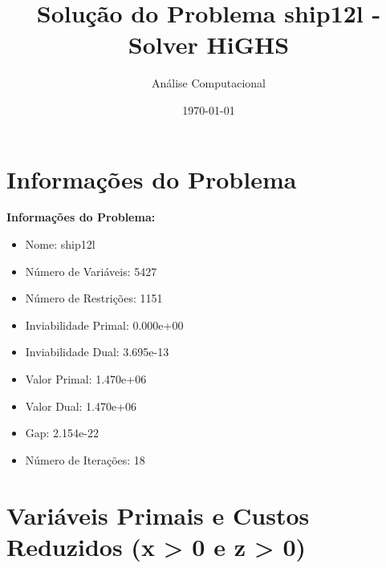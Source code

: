 \documentclass[12pt]{article}
\title{Solução do Problema ship12l - Solver HiGHS}
\author{Análise Computacional}
\date{\today}
\begin{document}
\maketitle

\section{Informações do Problema}

\textbf{Informações do Problema:}
\begin{itemize}
\item Nome: ship12l
\item Número de Variáveis: 5427
\item Número de Restrições: 1151
\item Inviabilidade Primal: 0.000e+00
\item Inviabilidade Dual: 3.695e-13
\item Valor Primal: 1.470e+06
\item Valor Dual: 1.470e+06
\item Gap: 2.154e-22
\item Número de Iterações: 18
\end{itemize}


\section{Variáveis Primais e Custos Reduzidos (x > 0 e z > 0)}
\end{document}
